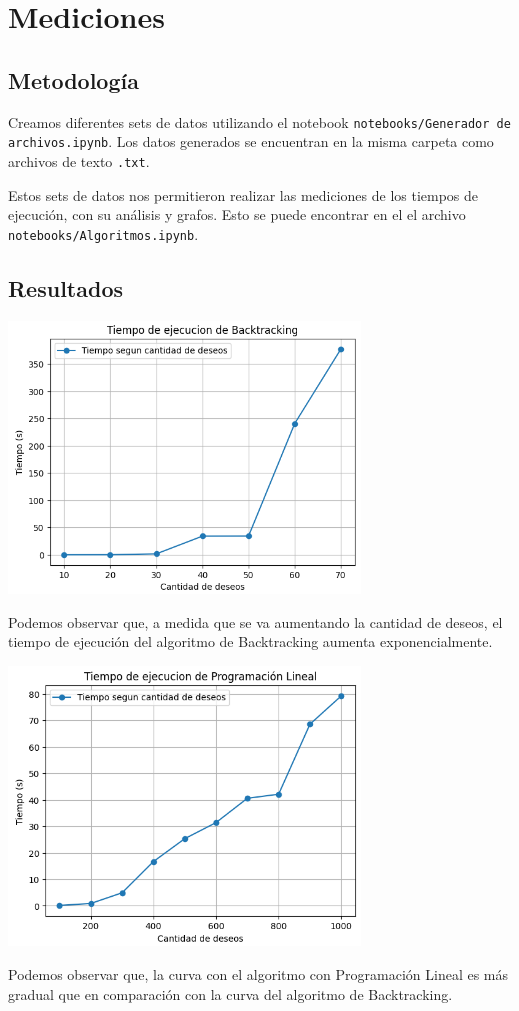 \documentclass{estilo}
\begin{document}
\newpage

\section{Mediciones}
\subsection{Metodología}

Creamos diferentes sets de datos utilizando el notebook \texttt{notebooks/Generador de archivos.ipynb}. Los datos generados se encuentran en la misma carpeta como archivos de texto \texttt{.txt}.

Estos sets de datos nos permitieron realizar las mediciones de los tiempos de ejecución, con su análisis y grafos. Esto se puede encontrar en el el archivo \texttt{notebooks/Algoritmos.ipynb}.

\subsection{Resultados}

\begin{center}
\includegraphics[width=0.7\textwidth]{img/tiempo_backtracking.png}

Podemos observar que, a medida que se va aumentando la cantidad de deseos, el tiempo de ejecución del algoritmo de Backtracking aumenta exponencialmente.
\end{center}

\begin{center}
\includegraphics[width=0.7\textwidth]{img/tiempo_pl.png}

Podemos observar que, la curva con el algoritmo con Programación Lineal es más gradual que en comparación con la curva del algoritmo de Backtracking.
\end{center}
\end{document}
